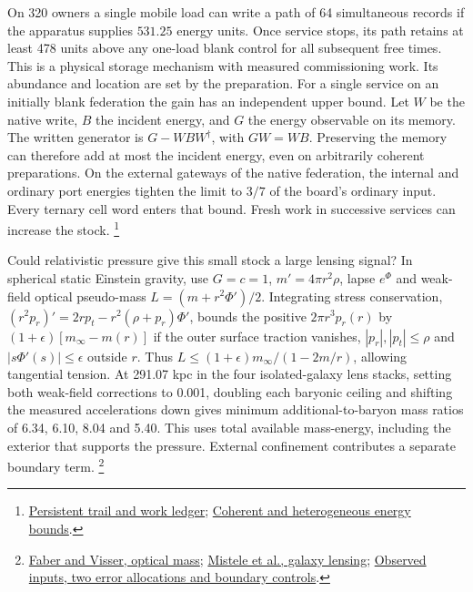 \documentclass[11pt]{article}
\begin{document}
On 320 owners a single mobile load can write a path of 64 simultaneous
records if the apparatus supplies $531.25$ energy units. Once service
stops, its path retains at least 478 units above any one-load blank
control for all subsequent free times. This is a physical storage
mechanism with measured commissioning work. Its abundance and location
are set by the preparation. For a single service on an initially blank
federation the gain has an independent upper bound. Let $W$ be the native
write, $B$ the incident energy, and $G$ the energy observable on its
memory. The written generator is $G-WBW^\dagger$, with $GW=WB$.
Preserving the memory can therefore add at most the incident energy,
even on arbitrarily coherent preparations. On the external gateways of
the native federation, the internal and ordinary port energies tighten
the limit to $3/7$ of the board's ordinary input. Every ternary cell word
enters that bound. Fresh work in successive services can increase the stock.%
\footnote{\href{https://github.com/FloatingPragma/observer-patch-holography/tree/main/model/experiments/interval_echo_shell_flux/product_address/green_response/material_recoil/overlap_source/native_boundary/stock}{Persistent trail and work ledger};
\href{https://github.com/FloatingPragma/observer-patch-holography/tree/main/model/experiments/interval_echo_shell_flux/product_address/green_response/material_recoil/overlap_source/native_boundary/population}{Coherent and heterogeneous energy bounds}.}

Could relativistic pressure give this small stock a large lensing signal?
In spherical static Einstein gravity, use $G=c=1$, $m'=4\pi r^2\rho$,
lapse $e^\Phi$ and weak-field optical pseudo-mass
$L=(m+r^2\Phi')/2$. Integrating stress conservation,
$(r^2p_r)'=2rp_t-r^2(\rho+p_r)\Phi'$, bounds the positive
$2\pi r^3p_r(r)$ by $(1+\epsilon)[m_\infty-m(r)]$ if the outer surface
traction vanishes, $|p_r|,|p_t|\le\rho$ and $|s\Phi'(s)|\le\epsilon$
outside $r$. Thus $L\le(1+\epsilon)m_\infty/(1-2m/r)$, allowing
tangential tension. At 291.07 kpc in the four isolated-galaxy lens
stacks, setting both weak-field corrections to 0.001, doubling each
baryonic ceiling and shifting the measured accelerations down gives
minimum additional-to-baryon mass ratios of 6.34, 6.10, 8.04 and 5.40.
This uses total available mass-energy, including the exterior that
supports the pressure. External confinement contributes a separate
boundary term.%
\footnote{\href{https://arxiv.org/abs/astro-ph/0512213}{Faber and Visser, optical mass};
\href{https://arxiv.org/abs/2406.09685}{Mistele et al., galaxy lensing};
\href{https://github.com/FloatingPragma/observer-patch-holography/tree/main/code/cosmology/rar_deep_regime/compensation/pressure_budget}{Observed inputs, two error allocations and boundary controls}.}
\end{document}
